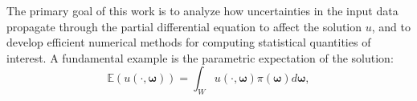 The primary goal of this work is to analyze how uncertainties in the input data propagate through the partial differential equation to affect the solution $u$, and to develop efficient numerical methods for computing statistical quantities of interest. A fundamental example is the parametric expectation of the solution:
%
 \begin{equation}
 \label{eq:QoI}
      \mathbb{E}\left(u(\cdot,\boldsymbol \omega)\right)=\int_W u(\cdot,\boldsymbol{\omega})\pi(\boldsymbol\omega)d\boldsymbol{\omega},
 \end{equation}
%

